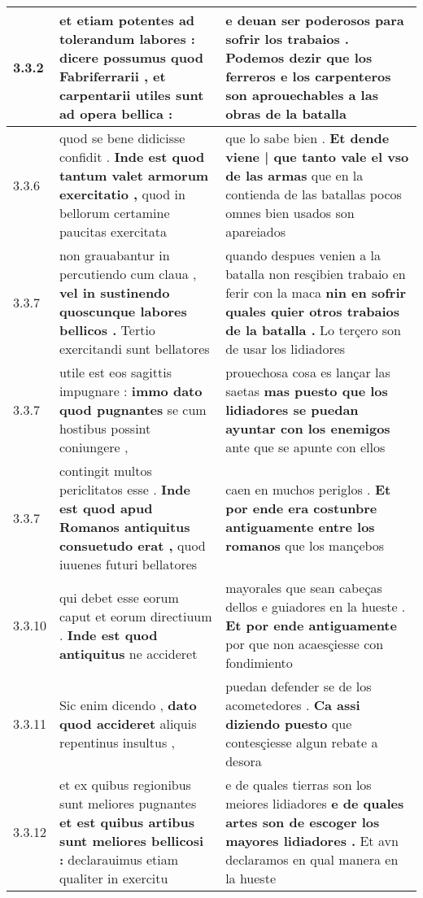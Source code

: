 \begin{tabular}{|p{1cm}|p{6.5cm}|p{6.5cm}|}
3.3.2 & et etiam potentes ad tolerandum labores : \textbf{ dicere possumus quod Fabriferrarii , et carpentarii } utiles sunt ad opera bellica : & e deuan ser poderosos para sofrir los trabaios . \textbf{ Podemos dezir } que los ferreros e los carpenteros son aprouechables a las obras de la batalla \\\hline
3.3.6 & quod se bene didicisse confidit . \textbf{ Inde est quod tantum valet armorum exercitatio , } quod in bellorum certamine paucitas exercitata & que lo sabe bien . \textbf{ Et dende viene | que tanto vale el vso de las armas } que en la contienda de las batallas pocos omnes bien usados son apareiados \\\hline
3.3.7 & non grauabantur in percutiendo cum claua , \textbf{ vel in sustinendo quoscunque labores bellicos . } Tertio exercitandi sunt bellatores & quando despues venien a la batalla non resçibien trabaio en ferir con la maca \textbf{ nin en sofrir quales quier otros trabaios de la batalla . } Lo terçero son de usar los lidiadores \\\hline
3.3.7 & utile est eos sagittis impugnare : \textbf{ immo dato quod pugnantes } se cum hostibus possint coniungere , & prouechosa cosa es lançar las saetas \textbf{ mas puesto que los lidiadores se puedan ayuntar con los enemigos } ante que se apunte con ellos \\\hline
3.3.7 & contingit multos periclitatos esse . \textbf{ Inde est quod apud Romanos antiquitus consuetudo erat , } quod iuuenes futuri bellatores & caen en muchos periglos . \textbf{ Et por ende era costunbre antiguamente entre los romanos } que los mançebos \\\hline
3.3.10 & qui debet esse eorum caput et eorum directiuum . \textbf{ Inde est quod antiquitus } ne accideret & mayorales que sean cabeças dellos e guiadores en la hueste . \textbf{ Et por ende antiguamente } por que non acaesçiesse con fondimiento \\\hline
3.3.11 & Sic enim dicendo , \textbf{ dato quod accideret } aliquis repentinus insultus , & puedan defender se de los acometedores . \textbf{ Ca assi diziendo puesto } que contesçiesse algun rebate a desora \\\hline
3.3.12 & et ex quibus regionibus sunt meliores pugnantes \textbf{ et est quibus artibus sunt meliores bellicosi : } declarauimus etiam qualiter in exercitu & e de quales tierras son los meiores lidiadores \textbf{ e de quales artes son de escoger los mayores lidiadores . } Et avn declaramos en qual manera en la hueste \\\hline

\end{tabular}
